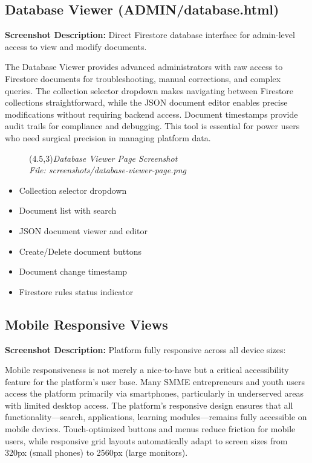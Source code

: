 \documentclass[a4paper,12pt]{article}
\begin{document}
\subsection{Database Viewer (ADMIN/database.html)}
\textbf{Screenshot Description:} Direct Firestore database interface for admin-level access to view and modify documents.

The Database Viewer provides advanced administrators with raw access to Firestore documents for troubleshooting, manual corrections, and complex queries. The collection selector dropdown makes navigating between Firestore collections straightforward, while the JSON document editor enables precise modifications without requiring backend access. Document timestamps provide audit trails for compliance and debugging. This tool is essential for power users who need surgical precision in managing platform data.

\begin{figure}[h]
    \centering
    \framebox(4.5,3){\textit{Database Viewer Page Screenshot}}\\
    \small\textit{File: screenshots/database-viewer-page.png}
\end{figure}

\begin{itemize}
    \item Collection selector dropdown
    \item Document list with search
    \item JSON document viewer and editor
    \item Create/Delete document buttons
    \item Document change timestamp
    \item Firestore rules status indicator
\end{itemize}

\subsection{Mobile Responsive Views}
\textbf{Screenshot Description:} Platform fully responsive across all device sizes:

Mobile responsiveness is not merely a nice-to-have but a critical accessibility feature for the platform's user base. Many SMME entrepreneurs and youth users access the platform primarily via smartphones, particularly in underserved areas with limited desktop access. The platform's responsive design ensures that all functionality—search, applications, learning modules—remains fully accessible on mobile devices. Touch-optimized buttons and menus reduce friction for mobile users, while responsive grid layouts automatically adapt to screen sizes from 320px (small phones) to 2560px (large monitors).
\end{document}
